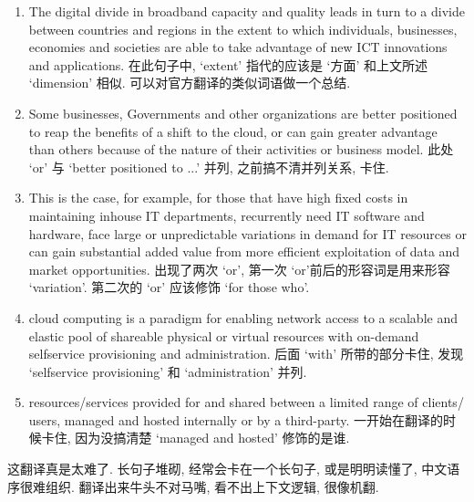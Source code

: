 \documentclass[a4paper, UTF8, 12pt]{article}
\begin{document}
\begin{enumerate}
    \item The digital divide in broadband capacity and quality leads in turn to a divide between countries and regions in the extent to which individuals, businesses, economies and societies are able to take advantage of new ICT innovations and applications. 在此句子中, `extent' 指代的应该是 `方面' 和上文所述 `dimension' 相似. 可以对官方翻译的类似词语做一个总结.
    
    \item  Some businesses, Governments and other organizations are better positioned to reap the benefits of a shift to the cloud, or can gain greater advantage than others because of the nature of their activities or business model. 此处 `or' 与 `better positioned to ...' 并列, 之前搞不清并列关系, 卡住.
    
    \item This is the case, for example, for those that have high fixed costs in maintaining inhouse IT departments, recurrently need IT software and hardware, face large or unpredictable variations in demand for IT resources or can gain substantial added value from more efficient exploitation of data and market opportunities. 出现了两次 `or', 第一次 `or'前后的形容词是用来形容 `variation'. 第二次的 `or' 应该修饰 `for those who'. 
    
    \item cloud computing is a paradigm for enabling network access to a scalable and elastic pool of shareable physical or virtual resources with on-demand selfservice provisioning and administration. 后面 `with' 所带的部分卡住, 发现 `selfservice provisioning' 和 `administration' 并列.
    
    \item resources/services provided for and shared between a limited range of clients/ users, managed and hosted internally or by a third-party. 一开始在翻译的时候卡住, 因为没搞清楚 `managed and hosted' 修饰的是谁.
\end{enumerate}

这翻译真是太难了. 长句子堆砌, 经常会卡在一个长句子, 或是明明读懂了, 中文语序很难组织. 翻译出来牛头不对马嘴, 看不出上下文逻辑, 很像机翻.
\end{document}
